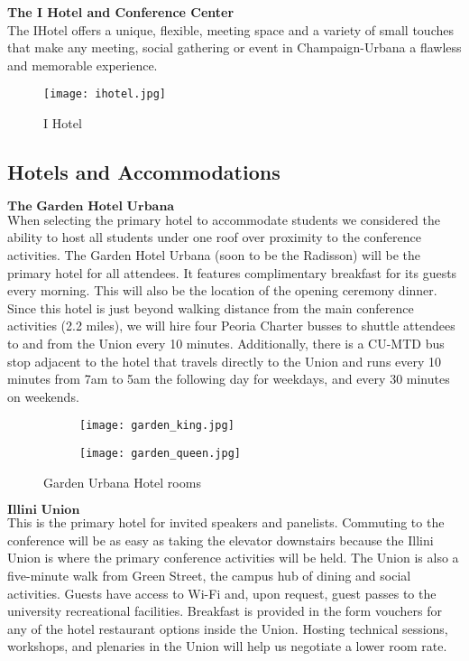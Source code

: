 \textbf{The I Hotel and Conference Center}\\
The IHotel offers a unique, flexible, meeting space and a variety of small touches that make any meeting, social gathering or event in Champaign-Urbana a flawless and memorable experience.\\

\begin{figure}[H]
    \centering
    \texttt{[image: ihotel.jpg]}
    \caption{I Hotel}
    \label{fig:beckman}
\end{figure}

\newpage
\subsection{Hotels and Accommodations}

$\textbf{The Garden Hotel Urbana}$\\
When selecting the primary hotel to accommodate students we considered the ability to host all students under one roof over proximity to the conference activities. The Garden Hotel Urbana (soon to be the Radisson) will be the primary hotel for all attendees. It features complimentary breakfast for its guests every morning. This will also be the location of the opening ceremony dinner. Since this hotel is just beyond walking distance from the main conference activities (2.2 miles), we will hire four Peoria Charter busses to shuttle attendees to and from the Union every 10 minutes. Additionally, there is a CU-MTD bus stop adjacent to the hotel that travels directly to the Union and runs every 10 minutes from 7am to 5am the following day for weekdays, and every 30 minutes on weekends.\\ 
\begin{figure}[H]
	\centering
	\begin{subfigure}{0.5\textwidth}
		\centering
		\texttt{[image: garden\_king.jpg]}
	\end{subfigure}%
	\begin{subfigure}{0.5\textwidth}
		\centering
		\texttt{[image: garden\_queen.jpg]}
	\end{subfigure}
	\caption{Garden Urbana Hotel rooms}		
\end{figure} 

$\textbf{Illini Union}$\\
This is the primary hotel for invited speakers and panelists. Commuting to the conference will be as easy as taking the elevator downstairs because the Illini Union is where the primary conference activities will be held. The Union is also a five-minute walk from Green Street, the campus hub of dining and social activities. Guests have access to Wi-Fi and, upon request, guest passes to the university recreational facilities. Breakfast is provided in the form vouchers for any of the hotel restaurant options inside the Union. Hosting technical sessions, workshops, and plenaries in the Union will help us negotiate a lower room rate.\\

